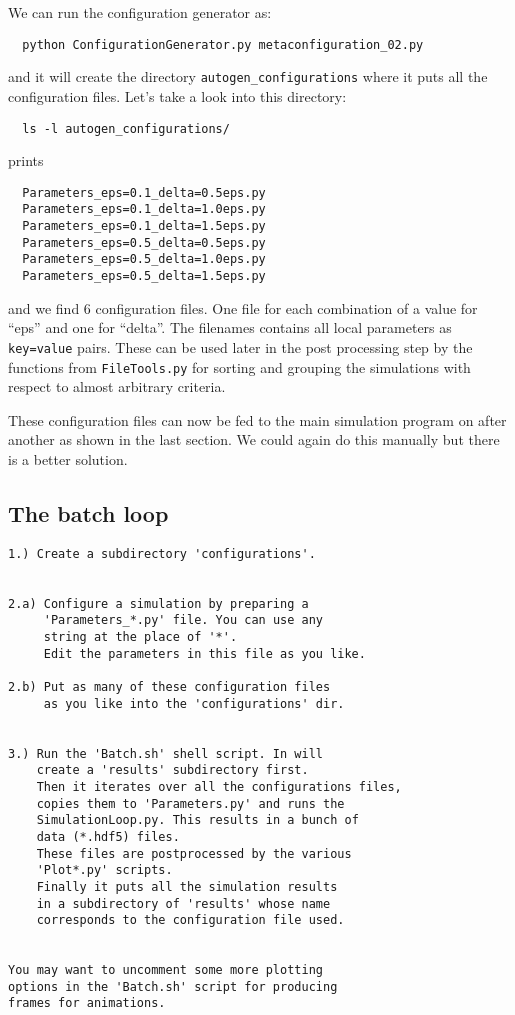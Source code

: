 \documentclass[a4paper,10pt]{report}
\begin{document}
We can run the configuration generator as:

\begin{verbatim}
  python ConfigurationGenerator.py metaconfiguration_02.py
\end{verbatim}

and it will create the directory \texttt{autogen\_configurations} where it puts
all the configuration files. Let's take a look into this directory:

\begin{verbatim}
  ls -l autogen_configurations/
\end{verbatim}

prints

\begin{verbatim}
  Parameters_eps=0.1_delta=0.5eps.py
  Parameters_eps=0.1_delta=1.0eps.py
  Parameters_eps=0.1_delta=1.5eps.py
  Parameters_eps=0.5_delta=0.5eps.py
  Parameters_eps=0.5_delta=1.0eps.py
  Parameters_eps=0.5_delta=1.5eps.py
\end{verbatim}

and we find 6 configuration files. One file for each combination of a value for
``eps'' and one for ``delta''. The filenames contains all local parameters as \texttt{key=value}
pairs. These can be used later in the post processing step by the functions from
\texttt{FileTools.py} for sorting and grouping the simulations with respect to
almost arbitrary criteria.

These configuration files can now be fed to the main simulation program on after
another as shown in the last section. We could again do this manually but there is
a better solution.

\subsection{The batch loop}

\begin{verbatim}
1.) Create a subdirectory 'configurations'.


2.a) Configure a simulation by preparing a
     'Parameters_*.py' file. You can use any
     string at the place of '*'.
     Edit the parameters in this file as you like.

2.b) Put as many of these configuration files
     as you like into the 'configurations' dir.


3.) Run the 'Batch.sh' shell script. In will
    create a 'results' subdirectory first.
    Then it iterates over all the configurations files,
    copies them to 'Parameters.py' and runs the
    SimulationLoop.py. This results in a bunch of
    data (*.hdf5) files.
    These files are postprocessed by the various
    'Plot*.py' scripts.
    Finally it puts all the simulation results
    in a subdirectory of 'results' whose name
    corresponds to the configuration file used.


You may want to uncomment some more plotting
options in the 'Batch.sh' script for producing
frames for animations.
\end{verbatim}
\end{document}

